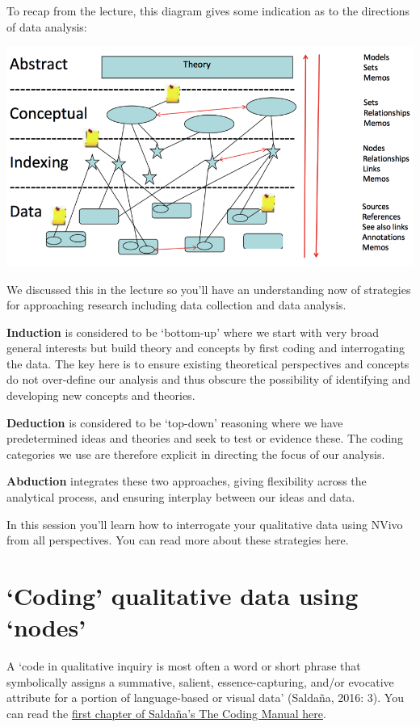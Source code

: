 \documentclass[]{book}
\theoremstyle{definition}
\theoremstyle{definition}
\theoremstyle{definition}
\theoremstyle{remark}
\begin{document}
To recap from the lecture, this diagram gives some indication as to the
directions of data analysis:

\includegraphics{imgs/qual_31.png}

We discussed this in the lecture so you'll have an understanding now of
strategies for approaching research including data collection and data
analysis.

\textbf{Induction} is considered to be `bottom-up' where we start with
very broad general interests but build theory and concepts by first
coding and interrogating the data. The key here is to ensure existing
theoretical perspectives and concepts do not over-define our analysis
and thus obscure the possibility of identifying and developing new
concepts and theories.

\textbf{Deduction} is considered to be `top-down' reasoning where we
have predetermined ideas and theories and seek to test or evidence
these. The coding categories we use are therefore explicit in directing
the focus of our analysis.

\textbf{Abduction} integrates these two approaches, giving flexibility
across the analytical process, and ensuring interplay between our ideas
and data.

In this session you'll learn how to interrogate your qualitative data
using NVivo from all perspectives. You can read more about these
strategies here.

\hypertarget{coding-qualitative-data-using-nodes}{%
\section{`Coding' qualitative data using
`nodes'}\label{coding-qualitative-data-using-nodes}}

A `code in qualitative inquiry is most often a word or short phrase that
symbolically assigns a summative, salient, essence-capturing, and/or
evocative attribute for a portion of language-based or visual data'
(Saldaña, 2016: 3). You can read the
\href{http://stevescollection.weebly.com/uploads/1/3/8/6/13866629/saldana_2009_the-coding-manual-for-qualitative-researchers.pdf}{first
chapter of Saldaña's The Coding Manual here}.
\end{document}
